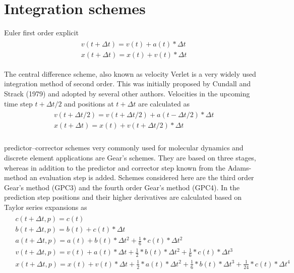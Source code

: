 \section*{Integration schemes}
Euler first order explicit
\begin{align}\label{eqn:euler}
    \begin{split}
    &v(t+\Delta{t}) = v(t) + a(t) * \Delta{t}\\
    &x(t+\Delta{t}) = x(t) + v(t) * \Delta{t}
    \end{split}
\end{align}
\par
The central difference scheme, also known as velocity Verlet is a very widely used integration
method of second order. This was initially proposed by Cundall and Strack (1979) and adopted by
several other authors. Velocities in the upcoming time step $t + \Delta{t}/2 $ and positions at
$t + \Delta{t}$ are calculated as
\begin{align}\label{eqn:verlet}
    \begin{split}
        &v(t + \Delta{t}/2) = v(t + \Delta{t}/2) +a(t - \Delta{t}/2) * \Delta{t}\\
        &x(t + \Delta{t}) = x(t) +v(t + \Delta{t}/2) * \Delta{t}\\
    \end{split}
\end{align}
\par
predictor–corrector schemes very commonly used for molecular dynamics and discrete element
applications are Gear’s schemes. They are based on three stages, whereas in addition to the
predictor and corrector step known from the Adams-method an evaluation step is added. Schemes
considered here are the third order Gear’s method (GPC3) and the fourth order Gear’s method (GPC4).
In the prediction step positions and their higher derivatives are calculated based on Taylor series
expansions as
\begin{align}\label{eqn:gearP}
    \begin{split}
        &c(t+\Delta{t}, p) = c(t)\\
        &b(t+\Delta{t}, p) = b(t) + c(t) *\Delta{t}\\
        &a(t+\Delta{t}, p) = a(t) + b(t) *\Delta{t}^2 + \frac{1}{6} * c(t) *\Delta{t}^2\\
        &v(t+\Delta{t}, p) = v(t) + a(t) *\Delta{t} + \frac{1}{2} * b(t) *\Delta{t}^2 + 
        \frac{1}{6} * c(t) *\Delta{t}^3\\
        &x(t+\Delta{t}, p) = x(t) + v(t) * \Delta{t} + \frac{1}{2} * a(t) *\Delta{t}^2 + 
        \frac{1}{6} * b(t) *\Delta{t}^3 + \frac{1}{24} * c(t) *\Delta{t}^4\\
    \end{split}
\end{align}

